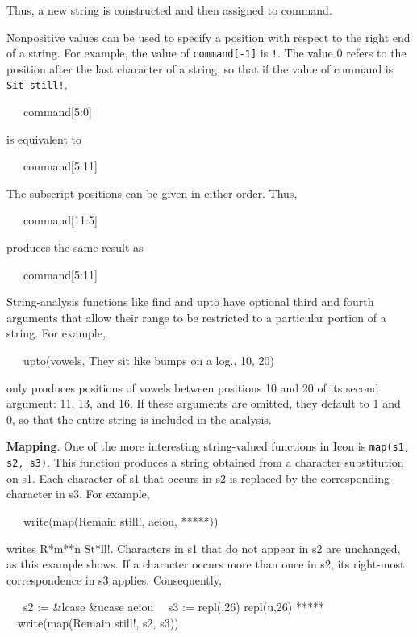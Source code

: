Thus, a new string is constructed and then assigned to command.

Nonpositive values can be used to specify a position with respect to
the right end of a string. For example, the value of
\texttt{command[-1]} is \texttt{{\textquotedbl}!{\textquotedbl}}. The
value 0 refers to the position after the last character of a string,
so that if the value of command is \texttt{{\textquotedbl}Sit
still!{\textquotedbl}},


\ \ \ command[5:0]


\noindent is equivalent to


\ \ \ command[5:11]


The subscript positions can be given in either order. Thus,

{\ttfamily\mdseries
\ \ \ command[11:5]}


\noindent produces the same result as


\ \ \ command[5:11]


String-analysis functions like find and upto have optional third and
fourth arguments that allow their range to be restricted to a
particular portion of a string. For example,

{\ttfamily\mdseries
\ \ \ upto(vowels, {\textquotedbl}They sit like bumps on a log.{\textquotedbl}, 10, 20)}

\noindent only produces positions of vowels between positions 10 and
20 of its second argument: 11, 13, and 16. If these arguments are
omitted, they default to 1 and 0, so that the entire string is
included in the analysis.


\textbf{Mapping}. One of the more interesting string-valued functions
in Icon is \texttt{map(s1, s2, s3)}. This function produces a string
obtained from a character substitution on s1. Each character of s1
that occurs in s2 is replaced by the corresponding character in
s3. For example,

{\ttfamily\mdseries
\ \ \ write(map({\textquotedbl}Remain still!{\textquotedbl}, {\textquotedbl}aeiou{\textquotedbl},
{\textquotedbl}*****{\textquotedbl}))}

\noindent writes R*m**n St*ll!. Characters in s1 that do not appear in
s2 are unchanged, as this example shows. If a character occurs more
than once in s2, its right-most correspondence in s3
applies. Consequently,

{\ttfamily\mdseries
\ \ \ s2 := \&lcase {\textbar}{\textbar} \&ucase {\textbar}{\textbar} {\textquotedbl}aeiou{\textquotedbl}\newline
 \ \ s3 := repl({\textquotedbl}{\textbar}{\textquotedbl},26) {\textbar}{\textbar}
repl({\textquotedbl}u{\textquotedbl},26) {\textbar}{\textbar} {\textquotedbl}*****{\textquotedbl}\newline
 \ \ write(map({\textquotedbl}Remain still!{\textquotedbl}, s2, s3))}

